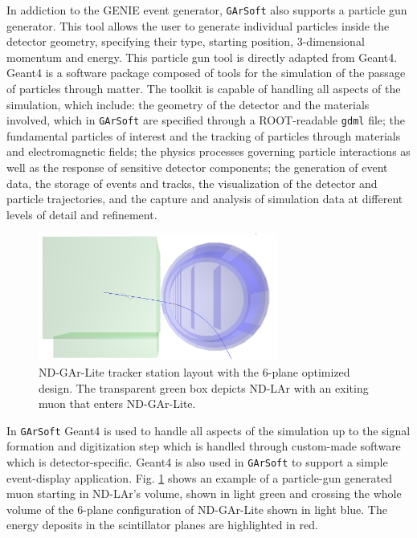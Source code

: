 In addiction to the GENIE event generator, \texttt{GArSoft} also supports a particle gun generator. This tool allows the user to generate individual particles inside the detector geometry, specifying their type, starting position, 3-dimensional momentum and energy. This particle gun tool is directly adapted from Geant4. Geant4 is a software package composed of tools for the simulation of the passage of particles through matter. The toolkit is capable of handling all aspects of the simulation, which include: the geometry of the detector and the materials involved, which in \texttt{GArSoft} are specified through a ROOT-readable \texttt{gdml} file; the fundamental particles of interest and the tracking of particles through materials and electromagnetic fields; the physics processes governing particle interactions as well as the response of sensitive detector components; the generation of event data, the storage of events and tracks, the visualization of the detector and particle trajectories, and the capture and analysis of simulation data at different levels of detail and refinement. 
\begin{figure}[t]
     \centering
     \includegraphics[width=0.7\textwidth]{figures/ch4-KF_NDGArLite/Event_display.png}
     \caption{ND-GAr-Lite tracker station layout with the 6-plane optimized design. The transparent green box depicts ND-LAr with an exiting muon that enters ND-GAr-Lite.}
        \label{fig:EvtDisplayplane}
\end{figure}

In \texttt{GArSoft} Geant4 is used to handle all aspects of the simulation up to the signal formation and digitization step which is handled through custom-made software which is detector-specific. Geant4 is also used in \texttt{GArSoft} to support a simple event-display application. Fig. \ref{fig:EvtDisplayplane} shows an example of a particle-gun generated muon starting in ND-LAr's volume, shown in light green and crossing the whole volume of the 6-plane configuration of ND-GAr-Lite shown in light blue. The energy deposits in the scintillator planes are highlighted in red. 

